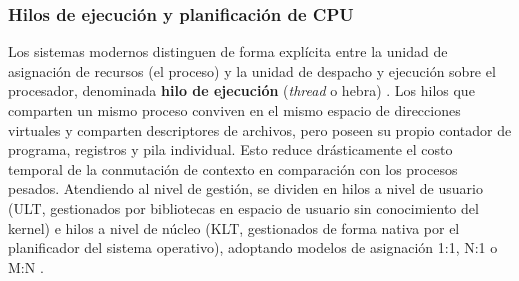 \documentclass[12pt]{article}
\begin{document}
\subsubsection{Hilos de ejecución y planificación de CPU}
Los sistemas modernos distinguen de forma explícita entre la unidad de asignación de recursos (el proceso) y la unidad de despacho y ejecución sobre el procesador, denominada \textbf{hilo de ejecución} (\textit{thread} o hebra) \parencite[\S 4.1, pp.\ 158--165]{stallings2018operating}. Los hilos que comparten un mismo proceso conviven en el mismo espacio de direcciones virtuales y comparten descriptores de archivos, pero poseen su propio contador de programa, registros y pila individual. Esto reduce drásticamente el costo temporal de la conmutación de contexto en comparación con los procesos pesados. Atendiendo al nivel de gestión, se dividen en hilos a nivel de usuario (ULT, gestionados por bibliotecas en espacio de usuario sin conocimiento del kernel) e hilos a nivel de núcleo (KLT, gestionados de forma nativa por el planificador del sistema operativo), adoptando modelos de asignación 1:1, N:1 o M:N \parencite[\S 4.2, pp.\ 120--128]{silberschatz2006fundamentos}.
\end{document}
